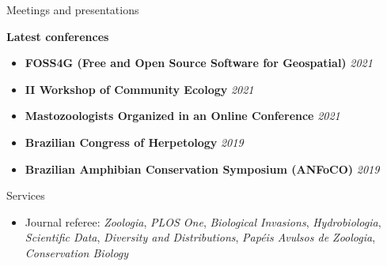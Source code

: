 \documentclass{resume}
\begin{document}
\begin{rSection}{Meetings and presentations}

{\bf Latest conferences}
\begin{itemize}
\item {\bf FOSS4G (Free and Open Source Software for Geospatial)} \hfill{\em 2021}
\item {\bf II Workshop of Community Ecology} \hfill{\em 2021}
\item {\bf Mastozoologists Organized in an Online Conference} \hfill{\em 2021}
\item {\bf Brazilian Congress of Herpetology} \hfill{\em 2019}
\item {\bf Brazilian Amphibian Conservation Symposium (ANFoCO)} \hfill{\em 2019}
\end{itemize}

\end{rSection}


\begin{rSection}{Services}
\begin{itemize}
\item Journal referee: {\it Zoologia}, {\it PLOS One}, {\it Biological Invasions}, {\it Hydrobiologia}, {\it Scientific Data}, {\it Diversity and Distributions}, {\it Papéis Avulsos de Zoologia}, {\it Conservation Biology}
\end{itemize}
\end{rSection}

\end{document}
